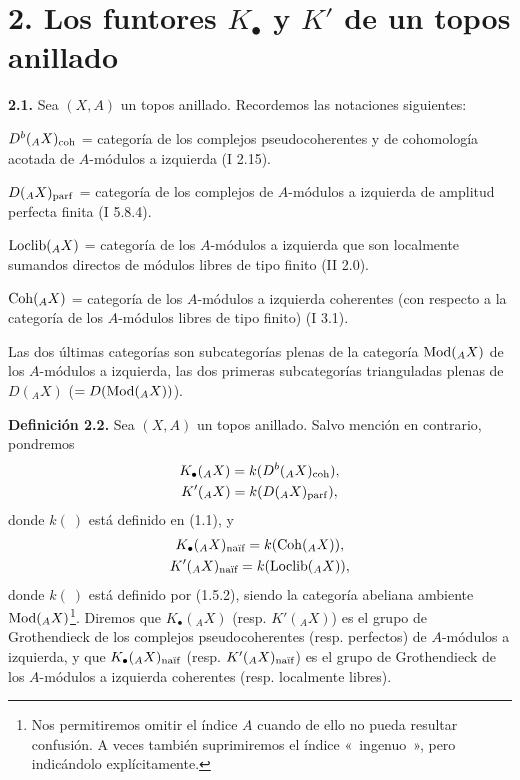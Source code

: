 \providecommand{\sisi}[2]{#2}

\section*{2. Los funtores \(K_{\bullet}\) y \(K'\) de un topos anillado}

\textbf{2.1.} Sea \((X,A)\) un topos anillado. Recordemos las notaciones siguientes:

\(D^b({}_A X)_{\coh}\) = categoría de los complejos pseudocoherentes y de cohomología acotada de \(A\)-módulos a izquierda (I 2.15).

\(D({}_A X)_{\parf}\) = categoría de los complejos de \(A\)-módulos a izquierda de amplitud perfecta finita (I 5.8.4).

\(\Loclib({}_A X)\) = categoría de los \(A\)-módulos a izquierda que son localmente sumandos directos de módulos libres de tipo finito (II 2.0).

\(\Coh({}_A X)\) = categoría de los \(A\)-módulos a izquierda coherentes (con respecto a la categoría de los \(A\)-módulos libres de tipo finito) (I 3.1).

Las dos últimas categorías son subcategorías plenas de la categoría \(\Mod({}_A X)\) de los \(A\)-módulos a izquierda, las dos primeras subcategorías trianguladas plenas de \(D({}_A X)\) (\(= D(\Mod({}_A X))\)).

\textbf{Definición 2.2.} Sea \((X,A)\) un topos anillado. Salvo mención en contrario, pondremos
\[
 \begin{gathered}
  K_\bullet({}_A X)=k(D^b({}_A X)_{\coh}),\\
  K'({}_A X)=k(D({}_A X)_{\parf}),
 \end{gathered}
\]
donde \(k(\ )\) está definido en (1.1), y
\[
 \begin{gathered}
  K_\bullet({}_A X)_{\naif}=k(\Coh({}_A X)),\\
  K'({}_A X)_{\naif}=k(\Loclib({}_A X)),
 \end{gathered}
\]
donde \(k(\ )\) está definido por (1.5.2), siendo la categoría abeliana ambiente \(\Mod({}_A X)\)\footnote{Nos permitiremos omitir el índice \(A\) cuando de ello no pueda resultar confusión. A veces también suprimiremos el índice «~ingenuo~», pero indicándolo explícitamente.}. Diremos que \(K_\bullet({}_A X)\) (resp. \(K'({}_A X)\)) es el grupo de Grothendieck de los complejos pseudocoherentes (resp. perfectos) de \(A\)-módulos a izquierda, y que \(K_\bullet({}_A X)_{\naif}\) (resp. \(K'({}_A X)_{\naif}\)) es el grupo de Grothendieck de los \(A\)-módulos a izquierda coherentes (resp. localmente libres).

